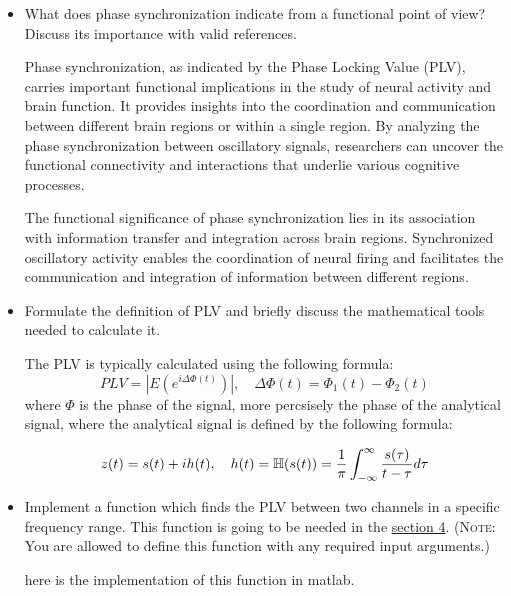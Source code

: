 \documentclass[12pt]{article}
\begin{document}
\begin{itemize}
	\item What does phase synchronization indicate from a functional point of view? Discuss its importance with valid references. \begin{qsolve}[]
		      Phase synchronization, as indicated by the Phase Locking Value (PLV), carries important functional implications in the study of neural activity and brain function. It provides insights into the coordination and communication between different brain regions or within a single region. By analyzing the phase synchronization between oscillatory signals, researchers can uncover the functional connectivity and interactions that underlie various cognitive processes.

		      \vspace*{1em}
		      The functional significance of phase synchronization lies in its association with information transfer and integration across brain regions. Synchronized oscillatory activity enables the coordination of neural firing and facilitates the communication and integration of information between different regions.
	      \end{qsolve}\medskip

	\item Formulate the definition of PLV and briefly discuss the mathematical tools needed to calculate it. \begin{qsolve}[]
		      The PLV is typically calculated using the following formula:
		      \[
			      PLV = |E(e^{i\Delta{\Phi(t)}})| ,\quad \Delta{\Phi(t)}=\Phi_1(t) - \Phi_2(t)
		      \]
		      where $\Phi$ is the phase of the signal, more percsisely the phase of the analytical signal, where
		      the analytical signal is defined by the following formula:

		      \[
			      z(t) = s(t) + ih(t),\quad h(t)=\mathbb{H}(s(t))=\frac{1}{\pi}\int_{-\infty}^{\infty} \frac{s(\tau)}{t-\tau}d\tau
		      \]

		      \cite[reference]{Phase-locking-value}
	      \end{qsolve}
	      \medskip

	\item Implement a function which finds the PLV between two channels in a specific frequency range. This function is going to be needed in the \hyperref[sec:sec4]{section 4}. (\textsc{Note}: You are allowed to define this function with any required input arguments.)   \begin{qsolve}[]
		      here is the implementation of this function in matlab.

	      \end{qsolve}
\end{itemize}
\end{document}
